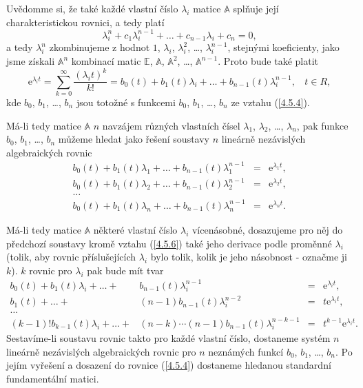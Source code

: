 \documentclass[a4paper, 12pt]{book}
\theoremstyle{definition}
\def\tn#1{{\mathbb{#1}}}    %
\begin{document}
Uvědomme si, že také každé vlastní číslo $\lambda_i$ matice $\tn A$ splňuje její 
charakteristickou rovnici, a tedy platí 
\begin{equation}
\lambda_i^n+c_1\lambda_i^{n-1}+\dots+c_{n-1}\lambda_i+c_n=0,
\end{equation}
a tedy $\lambda_i^n$ zkombinujeme z hodnot $1$, $\lambda_i$, $\lambda_i^2$, 
\dots, $\lambda_i^{n-1}$, stejnými koeficienty, jako jsme získali ${\tn A}^n$ 
kombinací matic $\tn E$, $\tn A$, ${\tn A}^2$, \dots, ${\tn A}^{n-1}$. 
Proto bude také platit
\begin{equation}\label{4.5.6}
\mathrm{e}^{\lambda_it}=\sum_{k=0}^\infty\frac{(\lambda_it)^k}{k!} = 
b_0(t) +b_1(t)\lambda_i+\dots+b_{n-1}(t)\lambda_i^{n-1}, ~~~~t\in R,
\end{equation}
kde $b_0$, $b_1$, \dots, $b_n$ jsou totožné s funkcemi $b_0$, $b_1$, \dots, 
$b_n$ ze vztahu (\ref{4.5.4}).

Má-li tedy matice $\tn A$ $n$ navzájem různých vlastních čísel $\lambda_1$, 
$\lambda_2$, \dots, $\lambda_n$, pak funkce $b_0$, $b_1$, \dots, $b_n$ můžeme
hledat jako řešení soustavy $n$ lineárně nezávislých algebraických rovnic 
\begin{equation}
\begin{array}{rcl}
b_0(t) +b_1(t)\lambda_1+\dots+b_{n-1}(t)\lambda_1^{n-1}&=&\mathrm{e}^{\lambda_1t},\\
b_0(t) +b_1(t)\lambda_2+\dots+b_{n-1}(t)\lambda_2^{n-1}&=&\mathrm{e}^{\lambda_2t},\\
\dots\\
b_0(t) +b_1(t)\lambda_n+\dots+b_{n-1}(t)\lambda_n^{n-1}&=&\mathrm{e}^{\lambda_nt}.
\end{array}
\end{equation}

Má-li tedy matice $\tn A$ některé vlastní číslo $\lambda_i$ vícenásobné, 
dosazujeme pro něj do předchozí soustavy kromě vztahu (\ref{4.5.6}) také jeho 
derivace podle proměnné $\lambda_i$ (tolik, aby rovnic příslušejících $\lambda_i$ 
bylo tolik, kolik je jeho násobnost - označme ji $k$). $k$ rovnic pro 
$\lambda_i$ pak bude mít tvar
\begin{equation}
\begin{array}{rrcl}
b_0(t) +b_1(t)\lambda_i+\dots+&b_{n-1}(t)\lambda_i^{n-1}&=&\mathrm{e}^{\lambda_it},\\
        b_1(t)+\dots+&(n-1)b_{n-1}(t)\lambda_i^{n-2}&=&t\mathrm{e}^{\lambda_it},\\
\dots\\
(k-1)!b_{k-1}(t)\lambda_i+\dots+&(n-k)\cdots(n-1)b_{n-1}(t)\lambda_i^{n-k-1}&=&t^{k-1}\mathrm{e}^{\lambda_it}.
\end{array}
\end{equation}
Sestavíme-li soustavu rovnic takto pro každé vlastní číslo, dostaneme systém $n$
lineárně nezávislých algebraických rovnic pro $n$ neznámých funkcí $b_0$, $b_1$, 
\dots, $b_n$. Po jejím vyřešení a dosazení do rovnice (\ref{4.5.4}) dostaneme
hledanou standardní fundamentální matici.
\end{document}
